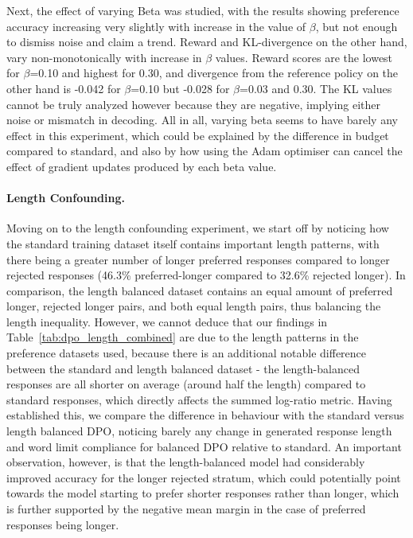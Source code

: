 \documentclass{article}
\begin{document}
 Next, the effect of varying Beta was studied, with the results showing preference accuracy increasing very slightly with increase in the value of $\beta$,  but not enough to dismiss noise and claim a trend. Reward and KL-divergence on the other hand, vary non-monotonically with increase in $\beta$ values. Reward scores are the lowest for $\beta$=0.10 and highest for 0.30, and divergence from the reference policy on the other hand is -0.042 for $\beta$=0.10 but -0.028 for $\beta$=0.03 and 0.30. The KL values cannot be truly analyzed however because they are negative, implying either noise or mismatch in decoding. All in all, varying beta seems to have barely any effect in this experiment, which could be explained by the difference in budget compared to standard, and also by how  using the Adam optimiser can cancel the effect of gradient updates produced by each beta value.


\paragraph{Length Confounding.}\label{subsubsec:results-t1-length}
 Moving on to the length confounding experiment, we start off by noticing how the standard training dataset itself contains important length patterns, with there being a greater number of longer preferred responses compared to longer rejected responses (46.3\% preferred-longer compared to 32.6\% rejected longer). In comparison, the length balanced dataset contains an equal amount of preferred longer, rejected longer pairs, and both equal length pairs, thus balancing the length inequality. However, we cannot deduce that our findings in Table~\ref{tab:dpo_length_combined} are due to the length patterns in the preference datasets used, because there is an additional notable difference between the standard and length balanced dataset - the length-balanced responses are all shorter on average (around half the length) compared to standard responses, which directly affects the summed log-ratio metric. Having established this, we compare the difference in behaviour with the standard versus length balanced DPO, noticing barely any change in generated response length and word limit compliance for balanced DPO relative to standard. An important observation, however, is that the length-balanced model had considerably improved accuracy for the longer rejected stratum, which could potentially point towards the model starting to prefer shorter responses rather than longer, which is further supported by the negative mean margin in the case of preferred responses being longer.
\end{document}
